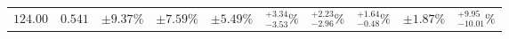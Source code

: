 \begin{table}[ht!]
{{\begin{tabular}{| cc | ccc | cccc | c |}
$124.00$ & $0.541$ & $\pm9.37\%$ & {\color{black!55}$\pm 7.59\%$} & {\color{black!55}$\pm 5.49\%$} & $^{+3.34}_{-3.53}\%$ & {\color{black!55}$^{+2.23}_{-2.96}\%$} & {\color{black!55}$^{+1.64}_{-0.48}\%$} & {\color{black!55}$\pm 1.87\%$} & $^{+9.95}_{-10.01}\%$  \\

\end{tabular}}}
\end{table}
